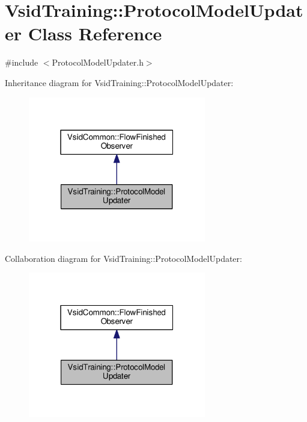 \hypertarget{class_vsid_training_1_1_protocol_model_updater}{\section{Vsid\-Training\-:\-:Protocol\-Model\-Updater Class Reference}
\label{class_vsid_training_1_1_protocol_model_updater}
}


{\ttfamily \#include $<$Protocol\-Model\-Updater.\-h$>$}



Inheritance diagram for Vsid\-Training\-:\-:Protocol\-Model\-Updater\-:
\nopagebreak
\begin{figure}[H]
\begin{center}
\leavevmode
\includegraphics[width=220pt]{class_vsid_training_1_1_protocol_model_updater__inherit__graph}
\end{center}
\end{figure}


Collaboration diagram for Vsid\-Training\-:\-:Protocol\-Model\-Updater\-:
\nopagebreak
\begin{figure}[H]
\begin{center}
\leavevmode
\includegraphics[width=220pt]{class_vsid_training_1_1_protocol_model_updater__coll__graph}
\end{center}
\end{figure}
